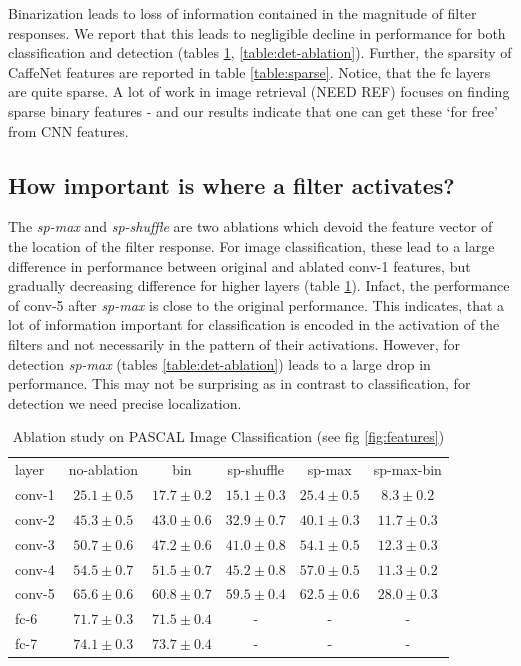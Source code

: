 \documentclass[runningheads]{llncs}
\begin{document}
Binarization leads to loss of information contained in the magnitude of filter responses. We report that this leads to negligible decline in performance for both classification and detection (tables \ref{table:class-ablation}, \ref{table:det-ablation}). Further, the sparsity of CaffeNet features are reported in table \ref{table:sparse}. Notice, that the fc layers are quite sparse. A lot of work in image retrieval (NEED REF) focuses on finding sparse binary features - and our results indicate that one can get these `for free' from CNN features. 

\subsection{How important is where a filter activates?}
\label{sub:imp-loc}
The \textit{sp-max} and \textit{sp-shuffle} are two ablations which devoid the feature vector of the location of the filter response. For image classification, these lead to a large difference in performance between original and ablated conv-1 features, but gradually decreasing difference for higher layers (table \ref{table:class-ablation}). Infact, the performance of conv-5 after \textit{sp-max} is close to the original performance. This indicates, that a lot of information important for classification is encoded in the activation of the filters and not necessarily in the pattern of their activations. However, for detection \textit{sp-max} (tables \ref{table:det-ablation}) leads to a large drop in performance. 
This may not be surprising as in contrast to classification, for detection we need precise localization.

\setlength{\tabcolsep}{4pt}
\begin{table}[t!]
\begin{center}
\caption{Ablation study on PASCAL Image Classification (see fig \ref{fig:features})}
\label{table:class-ablation}
\begin{tabular}{lccccc}
\hline\noalign{\smallskip}
layer & no-ablation & bin & sp-shuffle & sp-max & sp-max-bin \\
\noalign{\smallskip}
\hline
\noalign{\smallskip}
conv-1 & $25.1 \pm 0.5$ & $17.7 \pm 0.2$ & $15.1 \pm 0.3$ & $25.4 \pm 0.5$ & $8.3  \pm 0.2$  \\ 
conv-2 & $45.3 \pm 0.5$ & $43.0 \pm 0.6$ & $32.9 \pm 0.7$ & $40.1 \pm 0.3$ & $11.7 \pm 0.3$  \\ 
conv-3 & $50.7 \pm 0.6$ & $47.2 \pm 0.6$ & $41.0 \pm 0.8$ & $54.1 \pm 0.5$ & $12.3 \pm 0.3$ \\
conv-4 & $54.5 \pm 0.7$ & $51.5 \pm 0.7$ & $45.2 \pm 0.8$ & $57.0 \pm 0.5$ & $11.3 \pm 0.2$  \\
conv-5 & $65.6 \pm 0.6$ & $60.8 \pm 0.7$ & $59.5 \pm 0.4$ & $62.5 \pm 0.6$ & $28.0 \pm 0.3$ \\
fc-6   & $71.7 \pm 0.3$ & $71.5 \pm 0.4$ &  -             &  -        &  -    \\
fc-7   & $74.1 \pm 0.3$ & $73.7 \pm 0.4$ &  -             &  -        &  -   \\
\hline
\end{tabular}
\end{center}
\end{table}
\setlength{\tabcolsep}{1.4pt}
\end{document}
